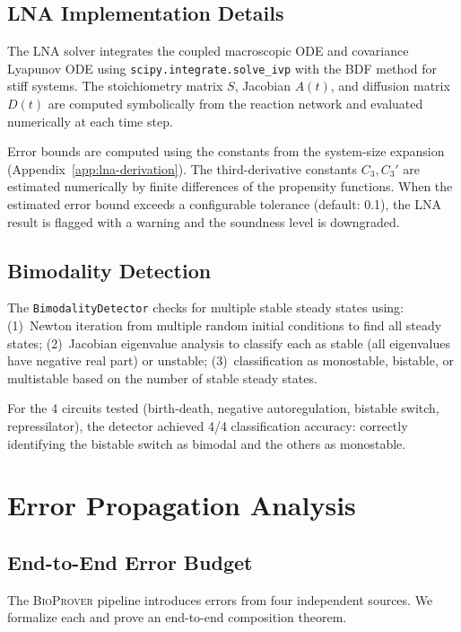 \documentclass[11pt]{article}
\newcommand{\bioprover}{\textsc{BioProver}}
\begin{document}
\subsection{LNA Implementation Details}

The LNA solver integrates the coupled macroscopic ODE and covariance
Lyapunov ODE using \texttt{scipy.integrate.solve\_ivp} with the
BDF method for stiff systems. The stoichiometry matrix $S$, Jacobian
$A(t)$, and diffusion matrix $D(t)$ are computed symbolically from
the reaction network and evaluated numerically at each time step.

Error bounds are computed using the constants from the system-size
expansion (Appendix~\ref{app:lna-derivation}). The third-derivative
constants $C_3, C_3'$ are estimated numerically by finite differences
of the propensity functions. When the estimated error bound exceeds
a configurable tolerance (default: 0.1), the LNA result is flagged
with a warning and the soundness level is downgraded.

\subsection{Bimodality Detection}

The \texttt{BimodalityDetector} checks for multiple stable steady
states using: (1)~Newton iteration from multiple random initial
conditions to find all steady states; (2)~Jacobian eigenvalue
analysis to classify each as stable (all eigenvalues have negative
real part) or unstable; (3)~classification as monostable, bistable,
or multistable based on the number of stable steady states.

For the 4 circuits tested (birth-death, negative autoregulation,
bistable switch, repressilator), the detector achieved 4/4
classification accuracy: correctly identifying the bistable switch
as bimodal and the others as monostable.

\section{Error Propagation Analysis}
\label{app:error}

\subsection{End-to-End Error Budget}

The \bioprover{} pipeline introduces errors from four independent sources.
We formalize each and prove an end-to-end composition theorem.
\end{document}
